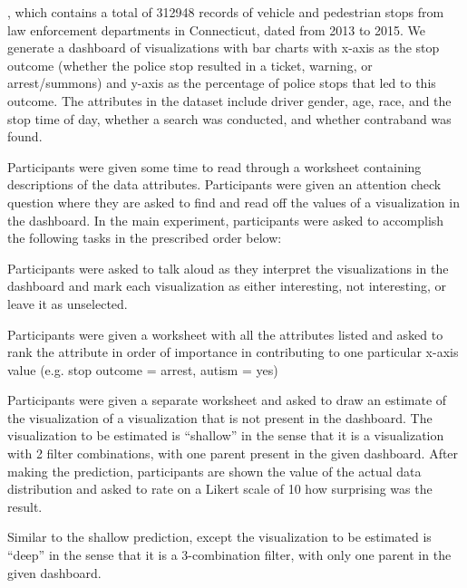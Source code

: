 , which contains a total of 312948 records of vehicle and pedestrian stops from law enforcement departments in Connecticut, dated from 2013 to 2015. We generate a dashboard of visualizations with bar charts with x-axis as the stop outcome (whether the police stop resulted in a ticket, warning, or arrest/summons) and y-axis as the percentage of police stops that led to this outcome. The attributes in the dataset include driver gender, age, race, and the stop time of day, whether a search was conducted, and whether contraband was found.
\par Participants were given some time to read through a worksheet containing descriptions of the data attributes. Participants were given an attention check question where they are asked to find and read off the values of a visualization in the dashboard. In the main experiment, participants were asked to accomplish the following tasks in the prescribed order below:

 Participants were asked to talk aloud as they interpret the visualizations in the dashboard and mark each visualization as either interesting, not interesting, or leave it as unselected.

 Participants were given a worksheet with all the attributes listed and asked to rank the attribute in order of importance in contributing to one particular x-axis value (e.g. stop outcome = arrest, autism = yes)

 Participants were given a separate worksheet and asked to draw an estimate of the visualization of a visualization that is not present in the dashboard. The visualization to be estimated is ``shallow'' in the sense that it is a visualization with 2 filter combinations, with one parent present in the given dashboard. After making the prediction, participants are shown the value of the actual data distribution and asked to rate on a Likert scale of 10 how surprising was the result.

 Similar to the shallow prediction, except the visualization to be estimated is ``deep'' in the sense that it is a 3-combination filter, with only one parent in the given dashboard.

